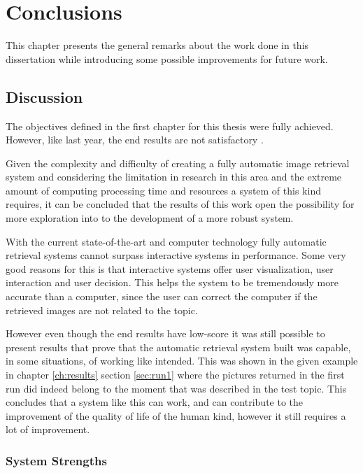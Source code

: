 \chapter{Conclusions}

This chapter presents the general remarks about the work done in this dissertation while introducing some possible improvements for future work.

\section{Discussion}

The objectives defined in the first chapter for this thesis were fully achieved. However, like last year, the end results are not satisfactory .


Given the complexity and difficulty of creating a fully automatic image retrieval system and considering the limitation in research in this area and the extreme amount of computing processing time and resources a system of this kind requires, it can be concluded that the results of this work open the possibility for more exploration into to the development of a more robust system.


With the current state-of-the-art and computer technology fully automatic retrieval systems cannot surpass interactive systems in performance. Some very good reasons for this is that interactive systems offer user visualization, user interaction and user decision. This helps the system to be tremendously more accurate than a computer, since the user can correct the computer if the retrieved images are not related to the topic.


However even though the end results have low-score it was still possible to present results that prove that the automatic retrieval system built was capable, in some situations, of working like intended. This was shown in the given example in chapter \ref{ch:results} section \ref{sec:run1} where the pictures returned in the first run did indeed belong to the moment that was described in the test topic. This concludes that a system like this can work, and can contribute to the improvement of the quality of life of the human kind, however it still requires a lot of improvement.



\subsection{System Strengths}

